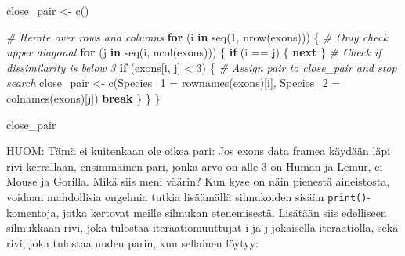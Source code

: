 \documentclass[
]{book}
\newenvironment{Shaded}{\begin{snugshade}}{\end{snugshade}}
\newcommand{\AttributeTok}[1]{\textcolor[rgb]{0.77,0.63,0.00}{#1}}
\newcommand{\CommentTok}[1]{\textcolor[rgb]{0.56,0.35,0.01}{\textit{#1}}}
\newcommand{\ControlFlowTok}[1]{\textcolor[rgb]{0.13,0.29,0.53}{\textbf{#1}}}
\newcommand{\DecValTok}[1]{\textcolor[rgb]{0.00,0.00,0.81}{#1}}
\newcommand{\FunctionTok}[1]{\textcolor[rgb]{0.00,0.00,0.00}{#1}}
\newcommand{\NormalTok}[1]{#1}
\newcommand{\OtherTok}[1]{\textcolor[rgb]{0.56,0.35,0.01}{#1}}
\newcommand{\SpecialCharTok}[1]{\textcolor[rgb]{0.00,0.00,0.00}{#1}}
\begin{document}
\begin{Shaded}
\begin{Highlighting}[]
\NormalTok{close\_pair }\OtherTok{\textless{}{-}} \FunctionTok{c}\NormalTok{()}

\CommentTok{\# Iterate over rows and columns}
\ControlFlowTok{for}\NormalTok{ (i }\ControlFlowTok{in} \FunctionTok{seq}\NormalTok{(}\DecValTok{1}\NormalTok{, }\FunctionTok{nrow}\NormalTok{(exons))) \{}
  \CommentTok{\# Only check upper diagonal}
  \ControlFlowTok{for}\NormalTok{ (j }\ControlFlowTok{in} \FunctionTok{seq}\NormalTok{(i, }\FunctionTok{ncol}\NormalTok{(exons))) \{}
    \ControlFlowTok{if}\NormalTok{ (i }\SpecialCharTok{==}\NormalTok{ j) \{}
        \ControlFlowTok{next}
\NormalTok{    \}}
    \CommentTok{\# Check if dissimilarity is below 3}
    \ControlFlowTok{if}\NormalTok{ (exons[i, j] }\SpecialCharTok{\textless{}} \DecValTok{3}\NormalTok{) \{}
      \CommentTok{\# Assign pair to close\_pair and stop search}
\NormalTok{      close\_pair }\OtherTok{\textless{}{-}} \FunctionTok{c}\NormalTok{(}\AttributeTok{Species\_1 =} \FunctionTok{rownames}\NormalTok{(exons)[i],}
                            \AttributeTok{Species\_2 =} \FunctionTok{colnames}\NormalTok{(exons)[j])}
      \ControlFlowTok{break}
\NormalTok{    \}}
\NormalTok{  \}}
\NormalTok{\}}

\NormalTok{close\_pair}
\end{Highlighting}
\end{Shaded}

HUOM: Tämä ei kuitenkaan ole oikea pari: Jos exons data framea käydään läpi rivi kerrallaan, ensimmäinen pari, jonka arvo on alle 3 on Human ja Lemur, ei Mouse ja Gorilla. Mikä siis meni väärin? Kun kyse on näin pienestä aineistosta, voidaan mahdollisia ongelmia tutkia lisäämällä silmukoiden sisään \texttt{print()}-komentoja, jotka kertovat meille silmukan etenemisestä. Lisätään siis edelliseen silmukkaan rivi, joka tulostaa iteraatiomuuttujat i ja j jokaisella iteraatiolla, sekä rivi, joka tulostaa uuden parin, kun sellainen löytyy:
\end{document}
